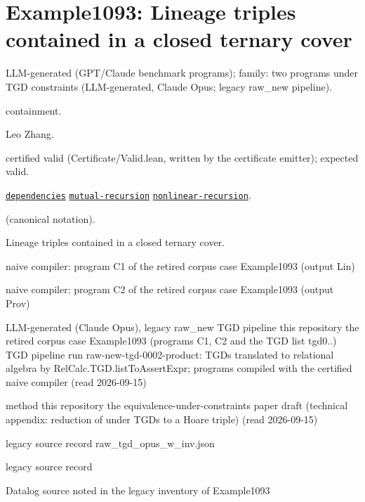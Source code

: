 \documentclass[10pt]{article}
\begin{document}
\Needspace{0.45\textheight}

\section{Example1093: Lineage triples contained in a closed ternary cover}\label{case:Example1093}

\begin{description}[leftmargin=2.6cm,style=nextline,itemsep=1pt]

\item[Category] LLM-generated (GPT/Claude benchmark programs); family: two programs under TGD constraints (LLM-generated, Claude Opus; legacy raw\_new pipeline).

\item[Kind] containment.

\item[Contributors] Leo Zhang.

\item[Status] certified valid (Certificate/Valid.lean, written by the certificate emitter); expected valid.

\item[Tags] \hyperref[tag:dependencies]{\texttt{dependencies}} \hyperref[tag:mutual-recursion]{\texttt{mutual-recursion}} \hyperref[tag:nonlinear-recursion]{\texttt{nonlinear-recursion}}.

\item[Input]  (canonical notation).

\item[Summary] Lineage triples contained in a closed ternary cover.

\item[Sides] naive compiler: program C1 of the retired corpus case Example1093 (output Lin) \par naive compiler: program C2 of the retired corpus case Example1093 (output Prov)

\item[Sources] {\raggedright LLM-generated (Claude Opus), legacy raw\_new TGD pipeline this repository the retired corpus case Example1093 (programs C1, C2 and the TGD list tgd0..) TGD pipeline run raw-new-tgd-0002-product: TGDs translated to relational algebra by RelCalc.TGD.listToAssertExpr; programs compiled with the certified naive compiler (read 2026-09-15) \par method this repository the equivalence-under-constraints paper draft (technical appendix: reduction of  under TGDs to a Hoare triple) (read 2026-09-15) \par legacy source record raw\_tgd\_opus\_w\_inv.json \par legacy source record  \par Datalog source noted in the legacy inventory of Example1093\par}


\end{description}
\end{document}
